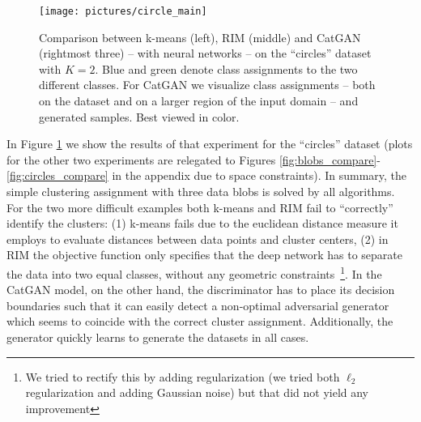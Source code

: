 \documentclass{article} \usepackage{iclr2016_conference,times}
\begin{document}
\begin{figure}[t]
  \texttt{[image: pictures/circle\_main]}
  \caption{Comparison between k-means (left), RIM (middle) and CatGAN
    (rightmost three) -- with neural networks -- on the ``circles''
    dataset with $K =2$. Blue and green denote class assignments to
    the two different classes. For CatGAN we visualize class
    assignments -- both on the dataset and on a larger region of the
    input domain -- and generated samples. Best viewed in color.}
  \label{fig:circles_main}
\end{figure}


In Figure \ref{fig:circles_main} we show the results of that
experiment for the ``circles'' dataset (plots for the other two
experiments are relegated to Figures
\ref{fig:blobs_compare}-\ref{fig:circles_compare} in the appendix due
to space constraints). In summary, the simple clustering assignment
with three data blobs is solved by all algorithms. For the two more
difficult examples both k-means and RIM fail to ``correctly'' identify
the clusters: (1) k-means fails due to the euclidean distance measure it
employs to evaluate distances between data points and cluster
centers, (2) in RIM the objective function only specifies that the deep
network has to separate the data into two equal classes, without any
geometric constraints~\footnote{We tried to rectify this by adding
  regularization (we tried both $\ell_2$ regularization and adding
  Gaussian noise) but that did not yield any improvement}. In the
CatGAN model, on the other hand, the discriminator has to place its
decision boundaries such that it can easily detect a non-optimal
adversarial generator which seems to coincide with the correct cluster
assignment. Additionally, the generator quickly learns to generate the
datasets in all cases.
\end{document}

